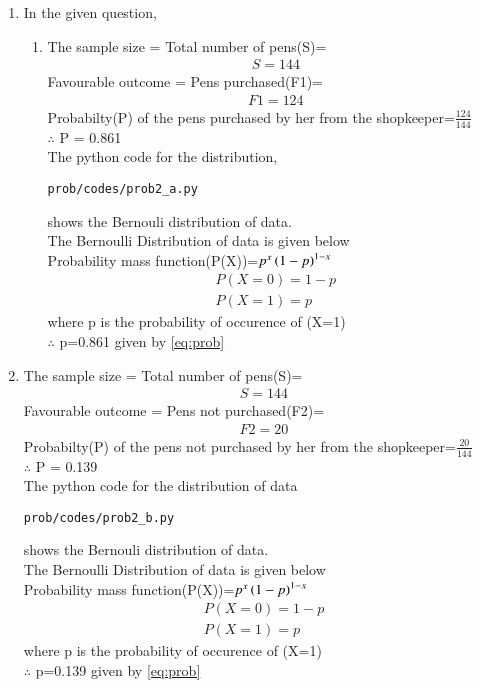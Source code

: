 \renewcommand{\theequation}{\theenumi}
\begin{enumerate}[label=\arabic*.,ref=\thesubsubsection.\theenumi]
\item In the given question,
\\
\begin{enumerate}
\item
The sample size = Total number of pens(S)=
\begin{align}
S=144
\end{align}
Favourable outcome = Pens purchased(F1)=
\begin{align}
F1=124 
\end{align}
Probabilty(P) of the pens purchased by her from the shopkeeper=$\frac{124}{144}$
\\
$\therefore$ P = 0.861
\label{eq:prob}
\\
The python code for the distribution,
\begin{lstlisting}
prob/codes/prob2_a.py
\end{lstlisting}
shows the Bernouli distribution of data.
\\
The Bernoulli Distribution of data is given below
\\
Probability mass function(P(X))=$p^x\left(1-p\right)^{1-x}$
\begin{align}
P(X=0)=1-p
\\
P(X=1)=p
\end{align}
where p is the probability of occurence of (X=1)
\\
$\therefore$ p=0.861 given by \ref{eq:prob}
\end{enumerate}
\item
The sample size = Total number of pens(S)=
\begin{align}
S=144
\end{align}
Favourable outcome = Pens not purchased(F2)=
\begin{align}
F2=20 
\end{align}
Probabilty(P) of the pens not purchased by her from the shopkeeper=$\frac{20}{144}$
\\
$\therefore$ P = 0.139
\label{eq:prob2}
\\
The python code for the distribution of data
\begin{lstlisting}
prob/codes/prob2_b.py
\end{lstlisting}
shows the Bernouli distribution of data.
\\
The Bernoulli Distribution of data is given below
\\
Probability mass function(P(X))=$p^x\left(1-p\right)^{1-x}$
\begin{align}
P(X=0)=1-p
\\
P(X=1)=p
\end{align}
where p is the probability of occurence of (X=1)
\\
$\therefore$ p=0.139 given by \ref{eq:prob}
\\
\end{enumerate}
